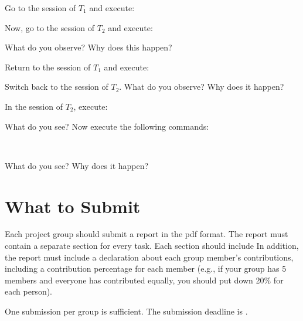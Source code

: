 \noindent {}

\vgap

\noindent Go to the session of $T_1$ and execute:

\vgap

\noindent {}

\vgap

\noindent Now, go to the session of $T_2$ and execute:

\vgap

\noindent {}

\vgap

\noindent What do you observe? Why does this happen?

\vgap

\noindent Return to the session of $T_1$ and execute:

\vgap

\noindent {}

\vgap

\noindent Switch back to the session of $T_2$. What do you observe? Why does it happen?

\vgap

\noindent In the session of $T_2$, execute:

\vgap

\noindent {}

\vgap

\noindent What do you see? Now execute the following commands:

\vgap

\noindent {}  \\
\noindent {}

\vgap

\noindent What do you see? Why does it happen?

\section{What to Submit}

Each project group should submit a report in the pdf format. The report must contain a separate section for every task. Each section should include
In addition, the report must include a declaration about each group member's contributions, including a contribution percentage for each member (e.g., if your group has 5 members and everyone has contributed equally, you should put down 20\% for each person).

\vgap

One submission per group is sufficient. The submission deadline is .



